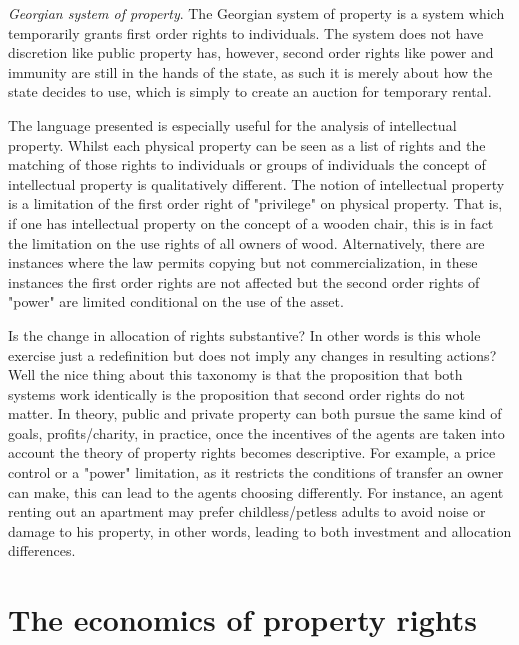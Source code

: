 \documentclass[12pt]{article}
\numberwithin{equation}{section}
\begin{document}
\textit{Georgian system of property}. The Georgian system of property is a system which temporarily grants first order rights to individuals. The system does not have discretion like public property has, however, second order rights like power and immunity are still in the hands of the state, as such it is merely about how the state decides to use, which is simply to create an auction for temporary rental.  

The language presented is especially useful for the analysis of intellectual property. Whilst each physical property can be seen as a list of rights and the matching of those rights to individuals or groups of individuals the concept of intellectual property is qualitatively different. The notion of intellectual property is a limitation of the first order right of "privilege" on physical property. That is, if one has intellectual property on the concept of a wooden chair, this is in fact the limitation on the use rights of all owners of wood. Alternatively, there are instances where the law permits copying but not commercialization, in these instances the first order rights are not affected but the second order rights of "power" are limited conditional on the use of the asset.  

Is the change in allocation of rights substantive? In other words is this whole exercise just a redefinition but does not imply any changes in resulting actions? Well the nice thing about this taxonomy is that the proposition that both systems work identically is the proposition that second order rights do not matter. In theory, public and private property can both pursue the same kind of goals, profits/charity, in practice, once the incentives of the agents are taken into account the theory of property rights becomes descriptive. For example, a price control or a "power" limitation, as it restricts the conditions of transfer an owner can make, this can lead to the agents choosing differently. For instance, an agent renting out an apartment may prefer childless/petless adults to avoid noise or damage to his property, in other words, leading to both investment and allocation differences. 

\newpage
\section{The economics of property rights}
\end{document}

